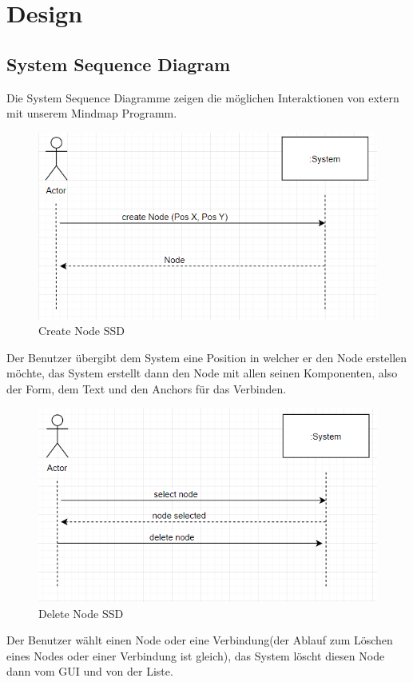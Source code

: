 \chapter{Design}
\label{chap:design}

\section{System Sequence Diagram}
\label{sec:system_sequence_diagramm}
Die System Sequence Diagramme zeigen die möglichen Interaktionen 
von extern mit unserem Mindmap Programm.

\begin{figure}[H]
	\centering
		\includegraphics[scale=0.7]{images/createnode.PNG}
	\caption{Create Node SSD}
	\label{fig:create_node_ssd}
\end{figure}

Der Benutzer übergibt dem System eine Position in welcher er den Node erstellen möchte, das System
erstellt dann den Node mit allen seinen Komponenten, also der Form, dem Text und den Anchors für das
Verbinden.

\begin{figure}[H]
	\centering
		\includegraphics[scale=0.7]{images/deletenode.PNG}
	\caption{Delete Node SSD}
	\label{fig:delete_node_ssd}
\end{figure}
Der Benutzer wählt einen Node oder eine Verbindung(der Ablauf zum Löschen eines Nodes oder einer Verbindung ist gleich), das System löscht diesen Node dann vom GUI und von der Liste. 

